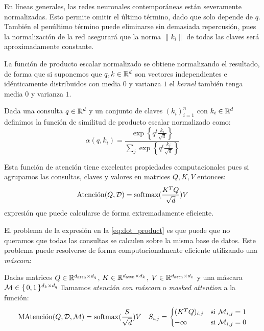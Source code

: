 En líneas generales, las redes neuronales contemporáneas están severamente normalizadas. Esto permite omitir el último término, dado que solo depende de \( q \). También el penúltimo término puede eliminarse sin demasiada repercusión, pues la normalización de la red asegurará que la norma \( \| k_i \| \) de todas las claves será aproximadamente constante.

La función de producto escalar normalizado se obtiene normalizando el resultado, de forma que si suponemos que \( q, k \in \mathbb{R}^{d} \) son vectores independientes e idénticamente distribuidos con media \( 0 \) y varianza \( 1 \) el \textit{kernel} también tenga media \( 0 \) y varianza \( 1 \).

\begin{definition}
Dada una consulta \( q \in \mathbb{R}^{d}\) y un conjunto de claves \( (k_i)_{i = 1}^n \) con \( k_i \in \mathbb{R}^{d} \) definimos la función de similitud de producto escalar normalizado como:
\[
    \alpha(q, k_{i}) = \frac{\exp \left\{q^t \frac{k_{i}}{\sqrt{d}} \right\}}{\sum_j \exp \left\{ q^t \frac{k_{j}}{\sqrt{d}} \right\}}
\]
\end{definition}

Esta función de atención tiene excelentes propiedades computacionales pues si agrupamos las consultas, claves y valores en matrices \( Q, K, V \) entonces:
\begin{equation} \label{eq:dot_product}
    \operatorname{Atenci\acute{o}n}(Q, \mathcal{D}) = \operatorname{softmax}(\frac{K^TQ}{\sqrt{d}}) V
\end{equation}
expresión que puede calcularse de forma extremadamente eficiente.

El problema de la expresión en la \cref{eq:dot_product} es que puede que no queramos que todas las consultas se calculen sobre la misma base de datos. Este problema puede resolverse de forma computacionalmente eficiente utilizando una \textit{máscara}:
\begin{definition}
    Dadas matrices \( Q \in \mathbb{R}^{d_\text{attn} \times d_q}\), \(K \in \mathbb{R}^{d_\text{attn} \times d_k}\), \(V \in \mathbb{R}^{d_\text{attn} \times d_v}\) y una máscara \( \mathcal{M} \in \{\,0, 1\,\}^{d_k \times d_q}\) llamamos \textit{atención con máscara} o \textit{masked attention} a la función:
    \begin{align*}
        \operatorname{MAtenci\acute{o}n}(Q, \mathcal{D}, \mathcal{M}) = \operatorname{softmax}(\frac{S}{\sqrt{d}})V && S_{i, j} = \begin{cases}
            (K^TQ)_{i,j} & \text{si $\mathcal{M}_{i, j} = 1$} \\
            -\infty & \text{si $\mathcal{M}_{i, j} = 0$} 
        \end{cases}
    \end{align*}
\end{definition}


